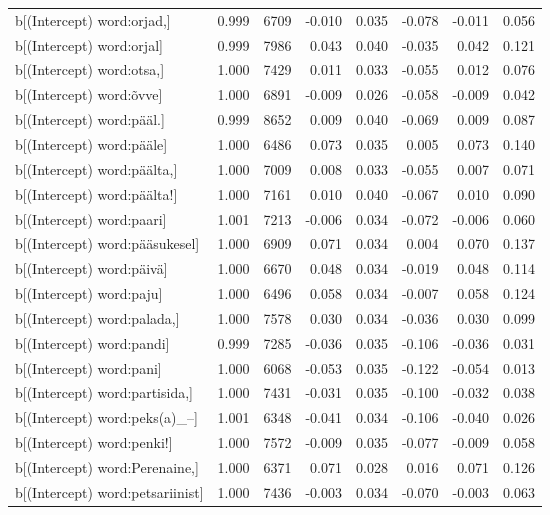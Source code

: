 \begin{longtable}{lrrrrrrr}
  b[(Intercept) word:orjad,] & 0.999 & 6709 & -0.010 & 0.035 & -0.078 & -0.011 & 0.056 \\ 
  b[(Intercept) word:orjal] & 0.999 & 7986 & 0.043 & 0.040 & -0.035 & 0.042 & 0.121 \\ 
  b[(Intercept) word:otsa,] & 1.000 & 7429 & 0.011 & 0.033 & -0.055 & 0.012 & 0.076 \\ 
  b[(Intercept) word:õvve] & 1.000 & 6891 & -0.009 & 0.026 & -0.058 & -0.009 & 0.042 \\ 
  b[(Intercept) word:pääl.] & 0.999 & 8652 & 0.009 & 0.040 & -0.069 & 0.009 & 0.087 \\ 
  b[(Intercept) word:pääle] & 1.000 & 6486 & 0.073 & 0.035 & 0.005 & 0.073 & 0.140 \\ 
  b[(Intercept) word:päälta,] & 1.000 & 7009 & 0.008 & 0.033 & -0.055 & 0.007 & 0.071 \\ 
  b[(Intercept) word:päälta!] & 1.000 & 7161 & 0.010 & 0.040 & -0.067 & 0.010 & 0.090 \\ 
  b[(Intercept) word:paari] & 1.001 & 7213 & -0.006 & 0.034 & -0.072 & -0.006 & 0.060 \\ 
  b[(Intercept) word:pääsukesel] & 1.000 & 6909 & 0.071 & 0.034 & 0.004 & 0.070 & 0.137 \\ 
  b[(Intercept) word:päivä] & 1.000 & 6670 & 0.048 & 0.034 & -0.019 & 0.048 & 0.114 \\ 
  b[(Intercept) word:paju] & 1.000 & 6496 & 0.058 & 0.034 & -0.007 & 0.058 & 0.124 \\ 
  b[(Intercept) word:palada,] & 1.000 & 7578 & 0.030 & 0.034 & -0.036 & 0.030 & 0.099 \\ 
  b[(Intercept) word:pandi] & 0.999 & 7285 & -0.036 & 0.035 & -0.106 & -0.036 & 0.031 \\ 
  b[(Intercept) word:pani] & 1.000 & 6068 & -0.053 & 0.035 & -0.122 & -0.054 & 0.013 \\ 
  b[(Intercept) word:partisida,] & 1.000 & 7431 & -0.031 & 0.035 & -0.100 & -0.032 & 0.038 \\ 
  b[(Intercept) word:peks(a)\_–] & 1.001 & 6348 & -0.041 & 0.034 & -0.106 & -0.040 & 0.026 \\ 
  b[(Intercept) word:penki!] & 1.000 & 7572 & -0.009 & 0.035 & -0.077 & -0.009 & 0.058 \\ 
  b[(Intercept) word:Perenaine,] & 1.000 & 6371 & 0.071 & 0.028 & 0.016 & 0.071 & 0.126 \\ 
  b[(Intercept) word:petsariinist] & 1.000 & 7436 & -0.003 & 0.034 & -0.070 & -0.003 & 0.063 \\ 

\end{longtable}
